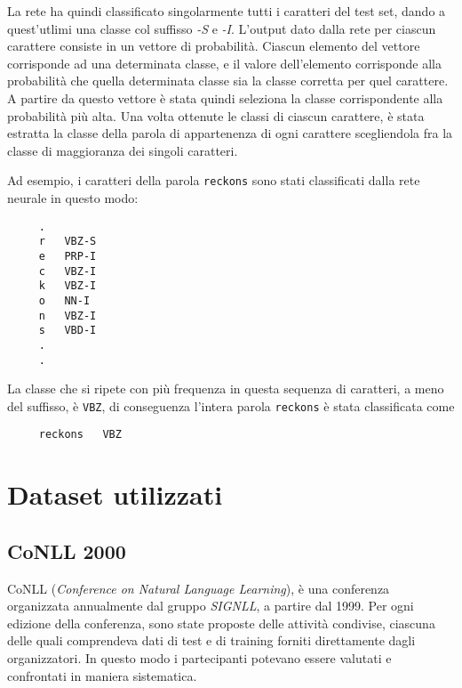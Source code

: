 La rete ha quindi classificato singolarmente tutti i caratteri del test set,
dando a quest'utlimi una classe col suffisso \emph{-S} e \emph{-I}. L'output
dato dalla rete per ciascun carattere consiste in un vettore di probabilit\`a.
Ciascun elemento del vettore corrisponde ad una determinata classe, e il valore
dell'elemento corrisponde alla probabilit\`a che quella determinata classe sia la
classe corretta per quel carattere. A partire da questo vettore \`e stata quindi
seleziona la classe corrispondente alla probabilit\`a pi\`u alta. Una volta ottenute
le classi di ciascun carattere, \`e stata estratta la classe della parola di appartenenza
di ogni carattere scegliendola fra la classe di maggioranza dei singoli caratteri.

Ad esempio, i caratteri della parola \texttt{reckons} sono stati classificati
dalla rete neurale in questo modo:

\begin{center}
  \begin{minipage}{5cm}
    \begin{verbatim}
     .
     r   VBZ-S
     e   PRP-I
     c   VBZ-I
     k   VBZ-I
     o   NN-I
     n   VBZ-I
     s   VBD-I
     .
     .
    \end{verbatim}
  \end{minipage}
\end{center}

La classe che si ripete con pi\`u frequenza in questa sequenza di caratteri, a
meno del suffisso, \`e \texttt{VBZ}, di conseguenza l'intera parola \texttt{reckons}
\`e stata classificata come

\begin{center}
  \begin{minipage}{5cm}
    \begin{verbatim}
     reckons   VBZ
    \end{verbatim}
  \end{minipage}
\end{center}

\section{Dataset utilizzati}
\nocite{Zanchetta:2005}
\nocite{Attardi:2008}

\subsection{CoNLL 2000}
CoNLL (\emph{Conference on Natural Language Learning}), \`e una conferenza
organizzata annualmente dal gruppo \emph{SIGNLL}, a partire dal 1999. Per ogni
edizione della conferenza, sono state proposte delle attivit\`a condivise, ciascuna
delle quali comprendeva dati di test e di training forniti direttamente dagli
organizzatori. In questo modo i partecipanti potevano essere valutati e
confrontati in maniera sistematica.

